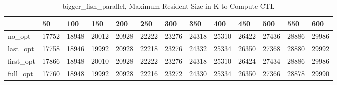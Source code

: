 \begin{table}
\caption{bigger\_fish\_parallel, Maximum Resident Size in K to Compute CTL}
\label{bigger_fish_parallel_CTL_size}
\begin{tabular}{lllllllllllll}
\toprule
 & 50 & 100 & 150 & 200 & 250 & 300 & 350 & 400 & 450 & 500 & 550 & 600 \\
\midrule
no\_opt & 17752 & 18948 & 20012 & 20928 & 22222 & 23276 & 24318 & 25310 & 26422 & 27436 & 28886 & 29986 \\
last\_opt & 17758 & 18946 & 19992 & 20928 & 22218 & 23276 & 24332 & 25334 & 26350 & 27368 & 28880 & 29992 \\
first\_opt & 17866 & 18948 & 20010 & 20928 & 22222 & 23276 & 24318 & 25310 & 26424 & 27434 & 28886 & 29986 \\
full\_opt & 17760 & 18948 & 19992 & 20928 & 22216 & 23272 & 24330 & 25334 & 26350 & 27366 & 28878 & 29990 \\
\bottomrule
\end{tabular}
\end{table}
